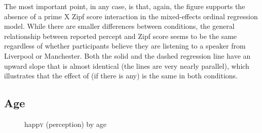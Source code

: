The most important point, in any case, is that, again, the figure supports the absence of a prime X Zipf score interaction in the mixed-effects ordinal regression model.
While there are smaller differences between  conditions, the general relationship between reported percept and Zipf score seems to be the same regardless of whether participants believe they are listening to a speaker from Liverpool or Manchester.
Both the solid and the dashed regression line have an upward slope that is almost identical (the lines are very nearly parallel), which illustrates that the effect of  (if there is any) is the same in both  conditions.

\subsection{Age}
\label{sec.perc_res.happy.age}

\begin{figure}
	
		\resizebox{.49\linewidth}{!}{} 
	\caption{happ\textsc{y} (perception) by age}
	\label{fig.scatter.happy.ext.age}
\end{figure}

